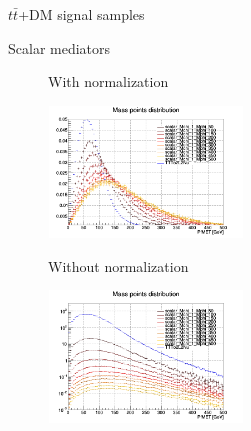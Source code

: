 \documentclass[8pt]{beamer}
\begin{document}
\begin{frame}{$t \bar t$+DM signal samples}
\justifying
\begin{block}{\centering Scalar mediators}\end{block} \vspace{-10pt}
\begin{figure}[htbp]
\centering
\begin{minipage}[b]{.49\textwidth}
\vspace{-5pt}
\begin{block}{\centering With normalization}\end{block}
\begin{center}
\includegraphics[width=5.2cm, height=3.5cm]{figs/scalarMETmChi1Norm.png}
\end{center}
\end{minipage}
\begin{minipage}[b]{.02\textwidth}\end{minipage}
\begin{minipage}[b]{.49\textwidth}
\vspace{-5pt}
\begin{block}{\centering Without normalization}\end{block}
\begin{center}
\includegraphics[width=5.2cm, height=3.5cm]{figs/scalarMETmChi1.png}
\end{center}
\end{minipage}
\end{figure} \vfill


\end{frame}
\end{document}
